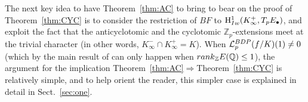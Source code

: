 \documentclass[a4paper,10pt]{amsart}
\numberwithin{equation}{section}
\numberwithin{equation}{section}
\theoremstyle{plain}
\theoremstyle{definition}
\theoremstyle{definition}
\theoremstyle{plain}
\theoremstyle{plain}
\theoremstyle{plain}
\theoremstyle{plain}
\newcommand{\Z}{\mathbb{Z}}
\newcommand{\Q}{\mathbb{Q}}
\newcommand{\Lcal}{\mathcal{L}}
\newcommand{\rH}{\mathrm{H}}
\begin{document}

The next key idea to have Theorem~\ref{thm:AC} to bring to bear on the proof of Theorem~\ref{thm:CYC} is to consider the restriction of $BF$ to $\rH^1_{\rm Iw}(K_\infty^+,T_pE_\bullet)$, and exploit the fact that the anticyclotomic and the cyclotomic $\Z_p$-extensions meet at the trivial character (in other words, $K_\infty^-\cap K_\infty^+=K$). When $\Lcal_p^{\rm BDP}(f/K)(1)\neq 0$ (which by the main result of \cite{BDP} can only happen when ${\rm rank}_\Z E(\Q)\leq 1$), the argument for the implication Theorem~\ref{thm:AC}$\Longrightarrow$Theorem~\ref{thm:CYC} is relatively simple, and to help orient the reader, this simpler case is explained in detail in Sect.~\ref{sec:one}.  
\end{document}

